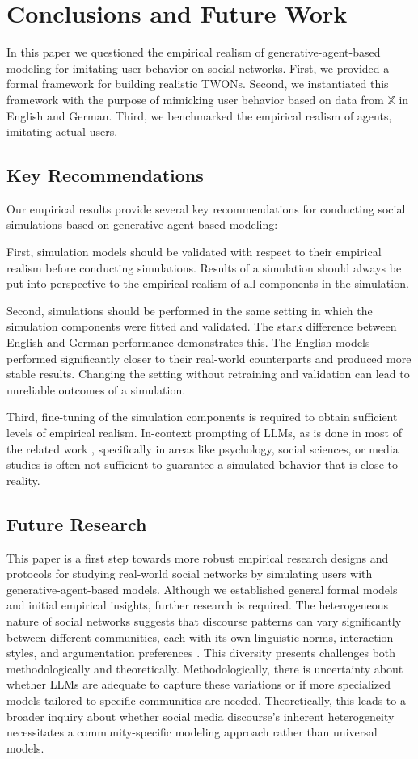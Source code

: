 \section{Conclusions and Future Work}
In this paper we questioned the empirical realism of generative-agent-based modeling for imitating user behavior on social networks. First, we provided a formal framework for building realistic TWONs. Second, we instantiated this framework with the purpose of mimicking user behavior based on data from $\mathbb{X}$ in English and German. Third, we benchmarked the empirical realism of agents, imitating actual users.

\subsection{Key Recommendations}
Our empirical results provide several key recommendations for conducting social simulations based on generative-agent-based modeling:

First, simulation models should be validated with respect to their empirical realism before conducting simulations. Results of a simulation should always be put into perspective to the empirical realism of all components in the simulation.

Second, simulations should be performed in the same setting in which the simulation components were fitted and validated. The stark difference between English and German performance demonstrates this. The English models performed significantly closer to their real-world counterparts and produced more stable results. Changing the setting without retraining and validation can lead to unreliable outcomes of a simulation.

Third, fine-tuning of the simulation components is required to obtain sufficient levels of empirical realism. In-context prompting of LLMs, as is done in most of the related work \cite{larooij2025large}, specifically in areas like psychology, social sciences, or media studies is often not sufficient to guarantee a simulated behavior that is close to reality.

\subsection{Future Research}
This paper is a first step towards more robust empirical research designs and protocols for studying real-world social networks by simulating users with generative-agent-based models. Although we established general formal models and initial empirical insights, further research is required. The heterogeneous nature of social networks suggests that discourse patterns can vary significantly between different communities, each with its own linguistic norms, interaction styles, and argumentation preferences \cite{gnach2017social}. This diversity presents challenges both methodologically and theoretically. Methodologically, there is uncertainty about whether LLMs are adequate to capture these variations \cite{anderson2024homogenization} or if more specialized models tailored to specific communities are needed. Theoretically, this leads to a broader inquiry about whether social media discourse's inherent heterogeneity necessitates a community-specific modeling approach rather than universal models.
